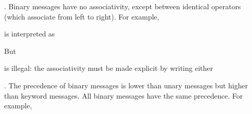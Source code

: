 \documentclass[letterpaper,10pt,english]{sphinxmanual}
\begin{document}
\begin{sphinxVerbatim}[commandchars=\\\{\}]
  
  
\end{sphinxVerbatim}

. Binary messages have no associativity, except between identical operators (which associate from left to right). For example,

\begin{sphinxVerbatim}[commandchars=\\\{\}]
    
\end{sphinxVerbatim}

is interpreted as

\begin{sphinxVerbatim}[commandchars=\\\{\}]
    
\end{sphinxVerbatim}

But

\begin{sphinxVerbatim}[commandchars=\\\{\}]
    
\end{sphinxVerbatim}

is illegal: the associativity must be made explicit by writing either

\begin{sphinxVerbatim}[commandchars=\\\{\}]
          
\end{sphinxVerbatim}

. The precedence of binary messages is lower than unary messages but higher than keyword messages. All binary messages have the same precedence. For example,

\begin{sphinxVerbatim}[commandchars=\\\{\}]
    
\end{sphinxVerbatim}
\end{document}
